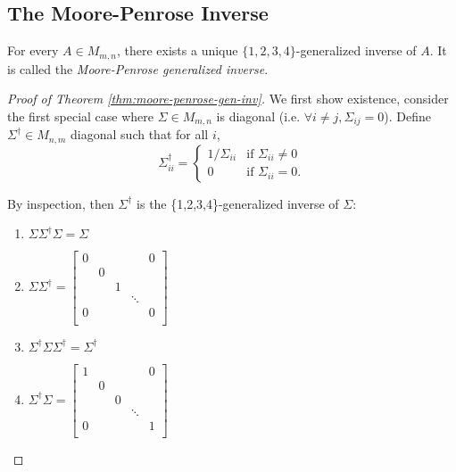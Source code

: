 \subsection{The Moore-Penrose Inverse}

\begin{theorem}
\label{thm:moore-penrose-gen-inv}
For every $A \in M_{m,n}$, there exists a unique $\{1,2,3,4\}$-generalized inverse of $A$. It is called the \textit{Moore-Penrose generalized inverse}.
\end{theorem}

\begin{proof}[Proof of Theorem \ref{thm:moore-penrose-gen-inv}]
We first show existence, consider the first special case where $\Sigma \in M_{m,n}$ is diagonal (i.e. $\forall i\not=j, \Sigma_{ij} = 0$). Define $\Sigma^\dag \in M_{n,m}$ diagonal such that for all $i$, 
$$
\Sigma_{ii}^\dag 
    = \begin{cases}
    1/\Sigma_{ii} & \text{if } \Sigma_{ii} \not= 0 \\
    0 & \text{if } \Sigma_{ii} = 0.
    \end{cases}
$$

By inspection, then $\Sigma^\dag$ is the \{1,2,3,4\}-generalized inverse of $\Sigma$:
\begin{enumerate}[label=(\roman*)]
    \item $\Sigma\Sigma^\dag\Sigma = \Sigma$
    \item $\Sigma\Sigma^\dag = \begin{bmatrix}
        0 & & & & 0 \\
         & 0 & & & \\
         & & 1 & & \\
         & & & \ddots & \\
        0 & & & & 0 \\
    \end{bmatrix}$
    \item $\Sigma^\dag\Sigma\Sigma^\dag = \Sigma^\dag$ 
    \item $\Sigma^\dag\Sigma = \begin{bmatrix}
        1 & & & & 0 \\
         & 0 & & & \\
         & & 0 & & \\
         & & & \ddots & \\
        0 & & & & 1 \\
    \end{bmatrix}$
\end{enumerate}


\end{proof}
